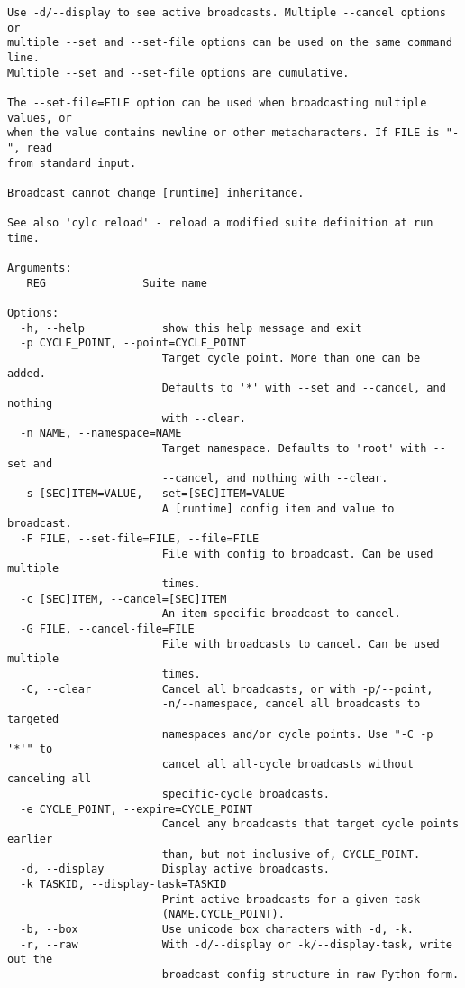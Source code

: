 \begin{lstlisting}
Use -d/--display to see active broadcasts. Multiple --cancel options or
multiple --set and --set-file options can be used on the same command line.
Multiple --set and --set-file options are cumulative.

The --set-file=FILE option can be used when broadcasting multiple values, or
when the value contains newline or other metacharacters. If FILE is "-", read
from standard input.

Broadcast cannot change [runtime] inheritance.

See also 'cylc reload' - reload a modified suite definition at run time.

Arguments:
   REG               Suite name

Options:
  -h, --help            show this help message and exit
  -p CYCLE_POINT, --point=CYCLE_POINT
                        Target cycle point. More than one can be added.
                        Defaults to '*' with --set and --cancel, and nothing
                        with --clear.
  -n NAME, --namespace=NAME
                        Target namespace. Defaults to 'root' with --set and
                        --cancel, and nothing with --clear.
  -s [SEC]ITEM=VALUE, --set=[SEC]ITEM=VALUE
                        A [runtime] config item and value to broadcast.
  -F FILE, --set-file=FILE, --file=FILE
                        File with config to broadcast. Can be used multiple
                        times.
  -c [SEC]ITEM, --cancel=[SEC]ITEM
                        An item-specific broadcast to cancel.
  -G FILE, --cancel-file=FILE
                        File with broadcasts to cancel. Can be used multiple
                        times.
  -C, --clear           Cancel all broadcasts, or with -p/--point,
                        -n/--namespace, cancel all broadcasts to targeted
                        namespaces and/or cycle points. Use "-C -p '*'" to
                        cancel all all-cycle broadcasts without canceling all
                        specific-cycle broadcasts.
  -e CYCLE_POINT, --expire=CYCLE_POINT
                        Cancel any broadcasts that target cycle points earlier
                        than, but not inclusive of, CYCLE_POINT.
  -d, --display         Display active broadcasts.
  -k TASKID, --display-task=TASKID
                        Print active broadcasts for a given task
                        (NAME.CYCLE_POINT).
  -b, --box             Use unicode box characters with -d, -k.
  -r, --raw             With -d/--display or -k/--display-task, write out the
                        broadcast config structure in raw Python form.

\end{lstlisting}
